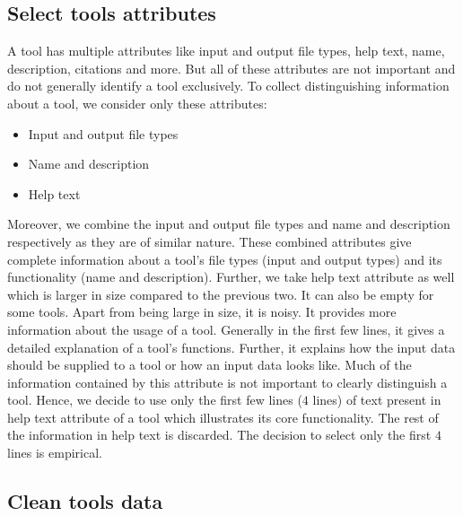 \subsection{Select tools attributes}
A tool has multiple attributes like input and output file types, help text, name, description, citations and more. But all of these attributes are not important and do not generally identify a tool exclusively. To collect distinguishing information about a tool, we consider only these attributes:
\begin{itemize}
	\item Input and output file types
	\item Name and description
	\item Help text
\end{itemize}
Moreover, we combine the input and output file types and name and description respectively as they are of similar nature. These combined attributes give complete information about a tool's file types (input and output types) and its functionality (name and description). Further, we take help text attribute as well which is larger in size compared to the previous two. It can also be empty for some tools. Apart from being large in size, it is noisy. It provides more information about the usage of a tool. Generally in the first few lines, it gives a detailed explanation of a tool's functions. Further, it explains how the input data should be supplied to a tool or how an input data looks like. Much of the information contained by this attribute is not important to clearly distinguish a tool. Hence, we decide to use only the first few lines ($4$ lines) of text present in help text attribute of a tool which illustrates its core functionality. The rest of the information in help text is discarded. The decision to select only the first $4$ lines is empirical.

\subsection{Clean tools data}
